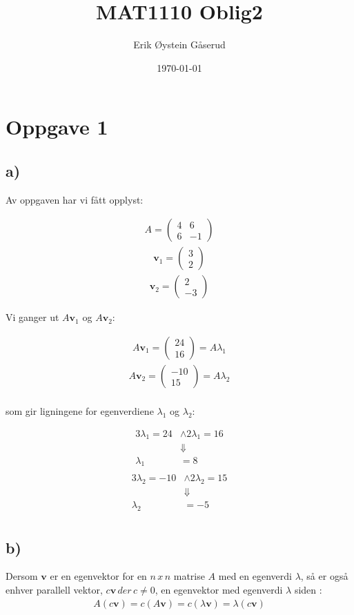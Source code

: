 \documentclass[11pt]{article}
\title{MAT1110 Oblig2}
\author{Erik Øystein Gåserud}
\date{\today}
\renewcommand{\vec}[1]{\mathbf{#1}}
\newcommand{\bpm}{\begin{pmatrix}}
\newcommand{\epm}{\end{pmatrix}}
\begin{document}
	\maketitle
	\section*{Oppgave 1}
	\subsection*{a)}
	Av oppgaven har vi fått opplyst:
	\begin{multicols}{3} \noindent
		\begin{align*}
		A = \bpm 4 & 6 \\ 6 & -1 \epm
		\end{align*}
		\begin{align*}
			\vec{v}_{1} = \bpm 3 \\ 2 \epm
		\end{align*}
		\begin{align*}
			\vec{v}_{2} = \bpm 2 \\ -3 \epm
		\end{align*}
	\end{multicols}
	Vi ganger ut $A\vec{v}_{1}$ og $A\vec{v}_{2}$:
	\begin{multicols}{2} \noindent
		\begin{align*}
			A\vec{v}_{1} = \bpm 24 \\ 16 \epm = A\lambda_{1}
		\end{align*}
		\begin{align*}
			A\vec{v}_{2} = \bpm -10 \\ 15 \epm = A\lambda_{2}\\
		\end{align*}
	\end{multicols}
		som gir ligningene for egenverdiene $\lambda_{1}$ og $\lambda_{2}$:
	\begin{multicols}{2} \noindent
		\begin{align*}
			3\lambda_{1} = 24&\wedge2\lambda_{1} = 16 \\
			&\Downarrow \\
			\lambda_{1} &= 8 \\
		\end{align*}
		\begin{align*}
			3\lambda_{2} = -10&\wedge2\lambda_{2} = 15 \\
			&\Downarrow \\
			\lambda_{2} &= -5\\
		\end{align*}
	\end{multicols}
	\subsection*{b)}
	Dersom $\vec{v}$ er en egenvektor for en $n\,x\,n$ matrise $A$ med en egenverdi $\lambda$, så er også enhver parallell vektor, $c\vec{v} \, der \, c\not=0$, en egenvektor med egenverdi $\lambda$ siden :
	\begin{align*}
	A(c\vec{v}) = c(A\vec{v}) = c(\lambda\vec{v}) = \lambda(c\vec{v})
	\end{align*}
\end{document}

